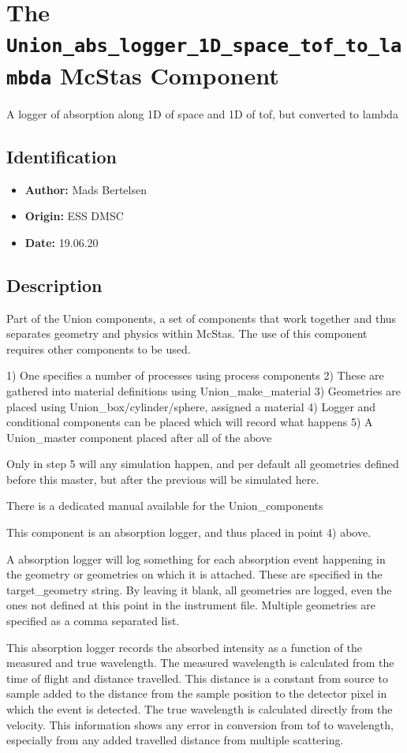 \section{The \texttt{Union\_abs\_logger\_1D\_space\_tof\_to\_lambda} McStas Component}
A logger of absorption along 1D of space and 1D of tof, but converted to lambda

\subsection*{Identification}
\begin{itemize}
  \item \textbf{Author:} Mads Bertelsen
  \item \textbf{Origin:} ESS DMSC
  \item \textbf{Date:} 19.06.20
\end{itemize}

\subsection*{Description}
Part of the Union components, a set of components that work together and thus separates geometry and physics within McStas. The use of this component requires other components to be used.

1) One specifies a number of processes using process components 2) These are gathered into material definitions using Union\_make\_material 3) Geometries are placed using Union\_box/cylinder/sphere, assigned a material 4) Logger and conditional components can be placed which will record what happens 5) A Union\_master component placed after all of the above

Only in step 5 will any simulation happen, and per default all geometries defined before this master, but after the previous will be simulated here.

There is a dedicated manual available for the Union\_components

This component is an absorption logger, and thus placed in point 4) above.

A absorption logger will log something for each absorption event happening in the geometry or geometries on which it is attached. These are specified in the target\_geometry string. By leaving it blank, all geometries are logged, even the ones not defined at this point in the instrument file. Multiple geometries are specified as a comma separated list.

This absorption logger records the absorbed intensity as a function of the measured and true wavelength. The measured wavelength is calculated from the time of flight and distance travelled. This distance is a constant from source to sample added to the distance from the sample position to the detector pixel in which the event is detected. The true wavelength is calculated directly from the velocity. This information shows any error in conversion from tof to wavelength, especially from any added travelled distance from multiple scattering.

